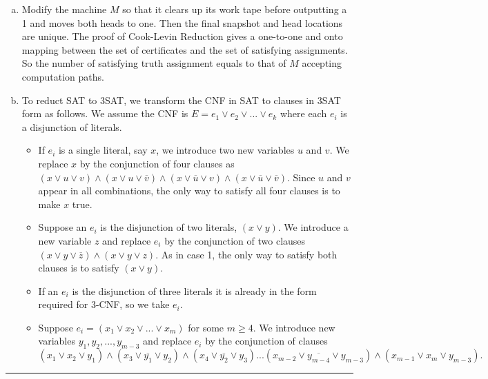 \documentclass[twoside]{article}
\newenvironment{problem}[2][Problem]{\begin{trivlist}
		\item[\hskip \labelsep {\bfseries #1}\hskip \labelsep {\bfseries #2.}]}{\end{trivlist}}
\newenvironment{solution}{{\bf Solution:}}{\hfill\rule{2mm}{2mm}}
\begin{document}
\begin{problem}{2.13}
\end{problem}
\begin{solution}
\begin{enumerate}[(a)]
	\item Modify the machine $M$ so that it clears up its work tape before outputting a 1 and
	moves both heads to one. Then the final snapshot and head locations are unique. 
	The proof of Cook-Levin Reduction gives a one-to-one and onto mapping between the set of certificates and the set of satisfying assignments. So the number of satisfying truth assignment equals to that of $M$ accepting computation paths.
 	\item To reduct SAT to 3SAT, we transform the CNF in SAT to clauses in 3SAT form as follows. We assume the CNF is $E=e_1 \vee e_2 \vee ... \vee e_k$ where each $e_i$	is a disjunction of literals. 
 	\begin{itemize}
 		\item If $e_i$ is a single literal, say $x$, we introduce two new variables $u$ and $v$. We replace $x$ by  the conjunction of four clauses as $(x\vee u\vee v)\wedge(x\vee u\vee \overline{v})\wedge(x\vee \overline{u}\vee v)\wedge(x\vee \overline{u}\vee \overline{v})$.
 		Since $u$ and $v$ appear in all combinations, the only way to satisfy all four clauses is to
 		make $x$ true.
 		\item Suppose an $e_i$ 	is the disjunction of two literals, $(x \vee y)$. We introduce a new variable $z$ and replace $e_i$ by the conjunction of two clauses $(x \vee y \vee \overline{z})\wedge(x \vee y \vee z)$. As in case 1, the
 		only way to satisfy both clauses is to satisfy $(x \vee y)$.
 		\item If an $e_i$ is the disjunction of three literals it is already in the form required for 3-CNF, so we take $e_i$.
 		\item 
Suppose $e_i = (x_1\vee x_2\vee...\vee x_m)$ for some $m \ge 4$. We introduce new variables $y_1, y_2, ..., y_{m−3}$ 	and replace $e_i$ by the conjunction of clauses
 		\begin{equation}
 		(x_1 \vee x_2 \vee y_1)\wedge(x_3 \vee \overline{y_1} \vee y_2)\wedge(x_4 \vee \overline{y_2} \vee y_3)...(x_{m−2} \vee \overline{y_{m-4}} \vee y_{m-3})\wedge(x_{m-1} \vee x_m \vee y_{m-3}). 
 		\end{equation}
 	\end{itemize}
 \end{enumerate}
\end{solution}
\end{document}
